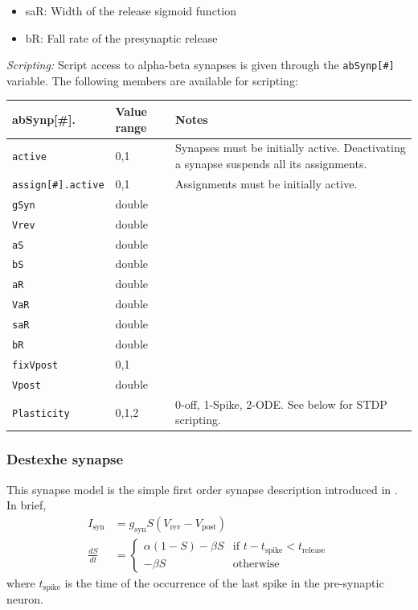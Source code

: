 \documentclass{article}
\begin{document}
\begin{itemize}
	\item saR: Width of the release sigmoid function
	\item bR: Fall rate of the presynaptic release
\end{itemize}

\noindent
\emph{Scripting:} Script access to alpha-beta synapses is given through the \texttt{abSynp[\#]} variable.
The following members are available for scripting: \\
\begin{tabularx}{\linewidth}{|ll|X|}
	\hline
	{\bf abSynp[\#].\textvisiblespace} & {\bf Value range} & {\bf Notes} \\
	\hline
	\texttt{active} & 0,1 & Synapses must be initially active. Deactivating a synapse suspends all
	its assignments. \\
	\texttt{assign[\#].active} & 0,1 & Assignments must be initially active. \\
	\texttt{gSyn} & double & \\
	\texttt{Vrev} & double & \\
	\texttt{aS} & double & \\
	\texttt{bS} & double & \\
	\texttt{aR} & double & \\
	\texttt{VaR} & double & \\
	\texttt{saR} & double & \\
	\texttt{bR} & double & \\
	\texttt{fixVpost} & 0,1 & \\
	\texttt{Vpost} & double & \\
	\texttt{Plasticity} & 0,1,2 & 0-off, 1-Spike, 2-ODE. See below for STDP scripting. \\
	\hline
\end{tabularx}


\subsubsection{Destexhe synapse}
This synapse model is the simple first order synapse description
introduced in \cite{Destexhe1994}. In brief,
\begin{align}
I_{\text{syn}}&= g_{\text{syn}} S (V_{\text{rev}} -
V_{\text{post}}) \\
\frac{dS}{dt} &= \left\{ \begin{array}{ll} 
  \alpha (1-S) - \beta S & \text{if } t-t_{\text{spike}} < t_{\text{release}} \\
- \beta S & \text{otherwise} 
\end{array} \right.
\end{align}
where $t_{\text{spike}}$ is the time of the occurrence of the last
spike in the pre-synaptic neuron.
\end{document}
